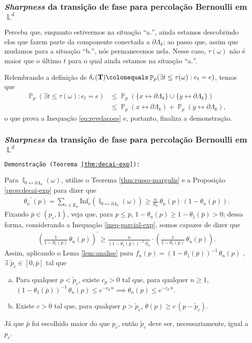 \documentclass[9pt]{beamer}
\theoremstyle{definition} %
\DeclareMathOperator{\PX}{\mathbb{P}} %
\DeclareMathOperator{\IX}{\mathbb{I}} %
\DeclareMathOperator{\LX}{\mathbb{L}} %
\begin{document}
	\begin{frame}[t]
	\frametitle{\textit{Sharpness} da transição de fase para percolação Bernoulli em $\LX^d$}
		Perceba que, enquanto estivermos na situação ``a$.$'', ainda estamos descobrindo elos que fazem parte da componente conectada a $\partial\Lambda_k$; ao passo que, assim que mudamos para a situação ``b$.$'', nós permanecemos nela. Nesse caso, $\tau(\omega)$ não é maior que o último $t$ para o qual ainda estamos na situação ``a$.$''.
		
		\par Relembrando a definição de $\delta_e(\text{\textbf{T}}) \colonequals \PX_p(\exists t \leq \tau(\omega) : e_t = e)$, temos que
		\begin{align*}
		\PX_p(\exists t \leq \tau(\omega) : e_t = e) &\leq \PX_p\left(\{x \leftrightarrow \partial\Lambda_k\} \cup \{y \leftrightarrow \partial\Lambda_k\}\right) \\
		&\leq \PX_p(x \leftrightarrow \partial\Lambda_k) + \PX_p(y \leftrightarrow \partial\Lambda_k),
		\end{align*}
		o que prova a Inequação \ref{eq:revelacoes} e, portanto, finaliza a demonstração.
	\end{frame}

	\begin{frame}[t]
	\frametitle{\textit{Sharpness} da transição de fase para percolação Bernoulli em $\LX^d$}
		\texttt{Demonstração (Teorema \ref{thm:decai-exp}):}
	
		Para $\IX_{0 \leftrightarrow \partial\Lambda_n}(\omega)$, utilize o Teorema \ref{thm:russo-margulis} e a Proposição \ref{prop:decai-exp} para dizer que
		\begin{align} \label{ineq-parcial-exp}
		{\theta_n}^{\prime}(p) = \sum_{e \in \text{E}_n}\text{Inf}_e(\IX_{0 \leftrightarrow \partial\Lambda_n}(\omega)) \geq \frac{n}{S_n} \, \theta_n(p) \, (1 - \theta_n(p)).
		\end{align}\pause
		 Fixando $\bar{p} \in (p_c, 1)$, veja que, para $p \leq \bar{p}$, $1 - \theta_n(p) \geq 1 - \theta_1(\bar{p}) > 0$; dessa forma, considerando a Inequação \ref{ineq-parcial-exp}, somos capazes de dizer que
		\begin{align*}
		\left(\frac{1}{1 - \theta_1(\bar{p})}\,\theta_n(p)\right)^{\prime} \geq \frac{n}{(1 - \theta_1(\bar{p}))^{-1}\, S_n} \cdot \left(\frac{1}{1 - \theta_1(\bar{p})}\,\theta_n(p)\right).
		\end{align*}\pause
		Assim, aplicando o Lema \ref{lem:analise} para $f_n(p) = (1 - \theta_1(\bar{p}))^{-1}\,\theta_n(p)$ , $\exists$ $\tilde{p}_c \in [0, \bar{p}]$ tal que	\begin{enumerate}[a.]
			\item Para qualquer $p < \tilde{p}_c$, existe $c_p > 0$ tal que, para qualquer $n \geq 1$, $(1 - \theta_1(\bar{p}))^{-1} \,\theta_n(p) \leq e^{-c_p\,n} \implies \theta_n(p) \leq e^{-c_p\,n}$.
			\item Existe $c > 0$ tal que, para qualquer $p > \tilde{p}_c$, $\theta(p) \geq c\,(p - \tilde{p}_c)$.
		\end{enumerate}
		Já que $\bar{p}$ foi escolhido maior do que $p_c$, então $\tilde{p}_c$ deve ser, necessariamente, igual a $p_c$.
	\end{frame}
\end{document}
